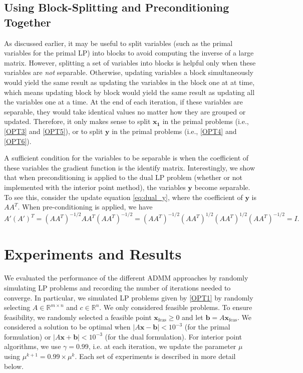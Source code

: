 \documentclass{article}
\begin{document}
{\color{red} \subsection*{Using Block-Splitting and Preconditioning Together}}
As discussed earlier, it may be useful to split variables (such as the primal variables for the primal LP) into blocks to avoid computing the inverse of a large matrix. However, splitting a set of variables into blocks is helpful only when these variables are {\it not} separable. Otherwise, updating variables a block simultaneously would yield the same result as updating the variables in the block one at at time, which means updating block by block would yield the same result as updating all the variables one at a time. At the end of each iteration, if these variables are separable, they would take identical values no matter how they are grouped or updated. Therefore, it only makes sense to split $\mathbf{x_1}$ in the primal problems (i.e.,  \eqref{OPT3} and \eqref{OPT5}), or to split $\mathbf{y}$ in the primal problems (i.e.,  \eqref{OPT4} and \eqref{OPT6}).

A sufficient condition for the variables to be separable is when the coefficient of these variables the gradient function is the identify matrix. Interestingly, we show that when preconditioning is applied to the dual LP problem (whether or not implemented with the interior point method), the variables $\mathbf{y}$ become separable. To see this, consider the update equation \eqref{eq:dual_y}, where the coefficient of $\mathbf{y}$ is $A A^T$. When pre-conditioning is applied, we have
\[
A' (A')^T  = (AA^T )^{-1/2}A A^T (AA^T )^{-1/2} =  (AA^T )^{-1/2}(AA^T )^{1/2} (AA^T )^{1/2} (AA^T )^{-1/2}  = I.
\]

\vspace{0.5in}
\section{Experiments and Results}

We evaluated the performance of the different ADMM approaches by randomly simulating LP problems and recording the number of iterations needed to converge. In particular, we simulated LP problems given by \eqref{OPT1} by randomly selecting $A\in\mathbb{R}^{m \times n}$ and $c\in\mathbb{R}^{n}$. We only considered feasible problems. To ensure feasibility, we randomly selected a feasible point $\mathbf{x}_{\text{feas}}\geq0$ and let $\mathbf{b}=A\mathbf{x}_{\text{feas}}$. We considered a solution to be optimal when $\left|A\mathbf{x}-\mathbf{b}\right|<10^{-3}$ (for the primal formulation) or $\left|A\mathbf{x}+\mathbf{b}\right|<10^{-3}$ (for the dual formulation). For interior point algorithms, we use $\gamma=0.99$, i.e. at each iteration, we update the parameter $\mu$ using $\mu^{k+1} = 0.99 \times \mu^k$. Each set of experiments is described in more detail below.
\end{document}
